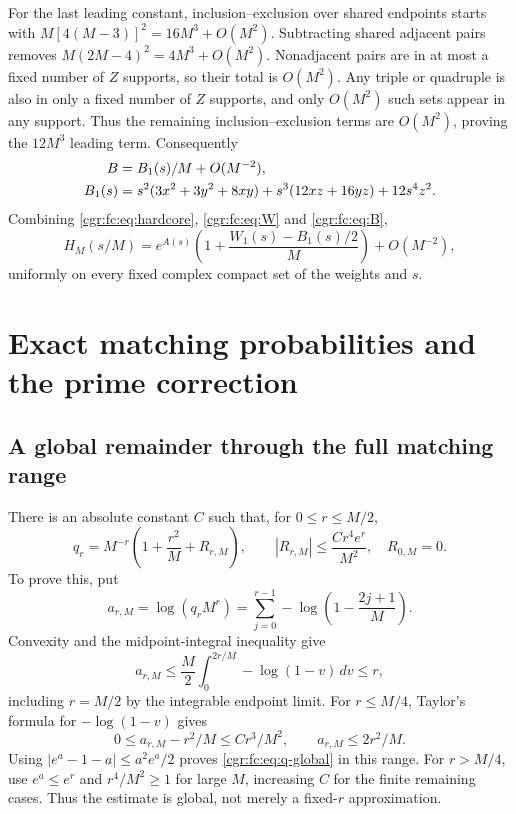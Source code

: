 \documentclass[11pt,letterpaper]{article}
\numberwithin{equation}{section}
\theoremstyle{definition}\newtheorem{definition}[theorem]{Definition}
\theoremstyle{remark}\newtheorem{remark}[theorem]{Remark}
\begin{document}
For the last leading constant, inclusion--exclusion over shared
endpoints starts with $M[4(M-3)]^2=16M^3+O(M^2)$.
Subtracting shared adjacent pairs removes
$M(2M-4)^2=4M^3+O(M^2)$. Nonadjacent pairs are in at most a
fixed number of $Z$ supports, so their total is $O(M^2)$.
Any triple or quadruple is also in only a fixed number of $Z$
supports, and only $O(M^2)$ such sets appear in any support.
Thus the remaining inclusion--exclusion terms are $O(M^2)$,
proving the $12M^3$ leading term.
Consequently
\begin{align}
 B&=B_1(s)/M+O(M^{-2}),\label{cgr:fc:eq:B}\\
 B_1(s)&=s^2(3x^2+3y^2+8xy)
       +s^3(12xz+16yz)+12s^4z^2.\notag
\end{align}
Combining \eqref{cgr:fc:eq:hardcore}, \eqref{cgr:fc:eq:W} and \eqref{cgr:fc:eq:B},
\begin{equation}\label{cgr:fc:eq:H-exp}
 H_M(s/M)=e^{A(s)}
 \left(1+\frac{W_1(s)-B_1(s)/2}M\right)+O(M^{-2}),
\end{equation}
uniformly on every fixed complex compact set of the weights and $s$.

\section{Exact matching probabilities and the prime correction}
\label{cgr:fc:sec:matching}
\subsection{A global remainder through the full matching range}
There is an absolute constant $C$ such that, for $0\le r\le M/2$,
\begin{equation}\label{cgr:fc:eq:q-global}
 q_r=M^{-r}\left(1+\frac{r^2}M+R_{r,M}\right),\qquad
 |R_{r,M}|\le\frac{Cr^4e^r}{M^2},\quad R_{0,M}=0.
\end{equation}
To prove this, put
\[
 a_{r,M}=\log(q_rM^r)=\sum_{j=0}^{r-1}
           -\log\left(1-\frac{2j+1}M\right).
\]
Convexity and the midpoint-integral inequality give
\[
 a_{r,M}\le\frac M2\int_0^{2r/M}-\log(1-v)\,dv\le r,
\]
including $r=M/2$ by the integrable endpoint limit. For $r\le M/4$,
Taylor's formula for $-\log(1-v)$ gives
\[
 0\le a_{r,M}-r^2/M\le Cr^3/M^2,\qquad a_{r,M}\le2r^2/M.
\]
Using $|e^a-1-a|\le a^2e^a/2$ proves \eqref{cgr:fc:eq:q-global} in
this range. For $r>M/4$, use $e^a\le e^r$ and
$r^4/M^2\ge1$ for large $M$, increasing $C$ for the finite
remaining cases. Thus the estimate is global, not merely a
fixed-$r$ approximation.
\end{document}
